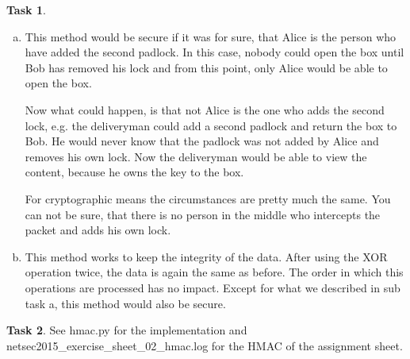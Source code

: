 \documentclass{scrartcl}
\theoremstyle{definition}
\newtheorem{exercise}{Task}
\begin{document}
\begin{exercise}
    \begin{enumerate}[a)]
        \item This method would be secure if it was for sure, that Alice is the
            person who have added the second padlock.
            In this case, nobody could open the box until Bob has removed his lock
            and from this point, only Alice would be able to open the box.
        
            Now what could happen, is that not Alice is the one who adds the
            second lock, e.g. the deliveryman could add a second padlock and
            return the box to Bob.  He would never know that the padlock was not
            added by Alice and removes his own lock. Now the deliveryman would
            be able to view the content, because he owns the key to the box.
        
            For cryptographic means the circumstances are pretty much the same. You
            can not be sure, that there is no person in the middle who intercepts
            the packet and adds his own lock.
        \item  
            This method works to keep the integrity of the data. After using the
            XOR operation twice, the data is again the same as before. The order
            in which this operations are processed has no impact.
            Except for what we described in sub task a, this method would also be secure.
    \end{enumerate}
\end{exercise}

\begin{exercise}
    See hmac.py for the implementation and
    netsec2015\_exercise\_sheet\_02\_hmac.log for the HMAC of the assignment
    sheet.
\end{exercise}
\end{document}
